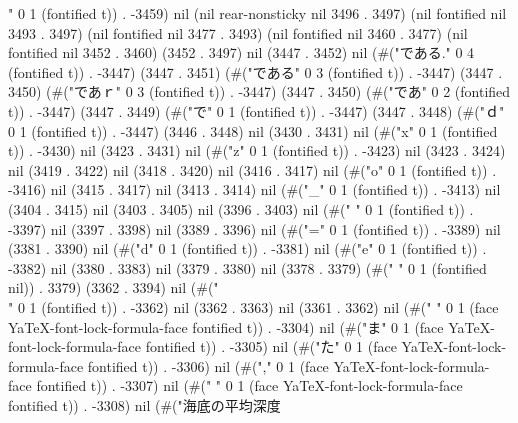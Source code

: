 " 0 1 (fontified t)) . -3459) nil (nil rear-nonsticky nil 3496 . 3497) (nil fontified nil 3493 . 3497) (nil fontified nil 3477 . 3493) (nil fontified nil 3460 . 3477) (nil fontified nil 3452 . 3460) (3452 . 3497) nil (3447 . 3452) nil (#("である." 0 4 (fontified t)) . -3447) (3447 . 3451) (#("である" 0 3 (fontified t)) . -3447) (3447 . 3450) (#("であｒ" 0 3 (fontified t)) . -3447) (3447 . 3450) (#("であ" 0 2 (fontified t)) . -3447) (3447 . 3449) (#("で" 0 1 (fontified t)) . -3447) (3447 . 3448) (#("ｄ" 0 1 (fontified t)) . -3447) (3446 . 3448) nil (3430 . 3431) nil (#("x" 0 1 (fontified t)) . -3430) nil (3423 . 3431) nil (#("z" 0 1 (fontified t)) . -3423) nil (3423 . 3424) nil (3419 . 3422) nil (3418 . 3420) nil (3416 . 3417) nil (#("o" 0 1 (fontified t)) . -3416) nil (3415 . 3417) nil (3413 . 3414) nil (#("_" 0 1 (fontified t)) . -3413) nil (3404 . 3415) nil (3403 . 3405) nil (3396 . 3403) nil (#(" " 0 1 (fontified t)) . -3397) nil (3397 . 3398) nil (3389 . 3396) nil (#("=" 0 1 (fontified t)) . -3389) nil (3381 . 3390) nil (#("d" 0 1 (fontified t)) . -3381) nil (#("e" 0 1 (fontified t)) . -3382) nil (3380 . 3383) nil (3379 . 3380) nil (3378 . 3379) (#(" " 0 1 (fontified nil)) . 3379) (3362 . 3394) nil (#("\\" 0 1 (fontified t)) . -3362) nil (3362 . 3363) nil (3361 . 3362) nil (#(" " 0 1 (face YaTeX-font-lock-formula-face fontified t)) . -3304) nil (#("ま" 0 1 (face YaTeX-font-lock-formula-face fontified t)) . -3305) nil (#("た" 0 1 (face YaTeX-font-lock-formula-face fontified t)) . -3306) nil (#("," 0 1 (face YaTeX-font-lock-formula-face fontified t)) . -3307) nil (#(" " 0 1 (face YaTeX-font-lock-formula-face fontified t)) . -3308) nil (#("海底の平均深度
